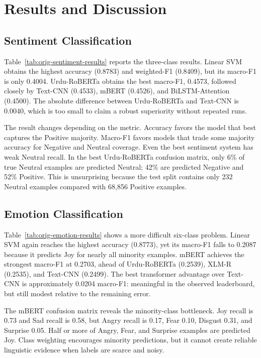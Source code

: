 \documentclass[conference]{IEEEtran}
\begin{document}
\section{Results and Discussion}



\subsection{Sentiment Classification}
Table~\ref{tab:orig-sentiment-results} reports the three-class results. Linear SVM obtains the highest accuracy (0.8783) and weighted-F1 (0.8409), but its macro-F1 is only 0.4004. Urdu-RoBERTa obtains the best macro-F1, 0.4573, followed closely by Text-CNN (0.4533), mBERT (0.4526), and BiLSTM-Attention (0.4500). The absolute difference between Urdu-RoBERTa and Text-CNN is 0.0040, which is too small to claim a robust superiority without repeated runs.

The result changes depending on the metric. Accuracy favors the model that best captures the Positive majority. Macro-F1 favors models that trade some majority accuracy for Negative and Neutral coverage. Even the best sentiment system has weak Neutral recall. In the best Urdu-RoBERTa confusion matrix, only 6\% of true Neutral examples are predicted Neutral; 42\% are predicted Negative and 52\% Positive. This is unsurprising because the test split contains only 232 Neutral examples compared with 68,856 Positive examples.

\subsection{Emotion Classification}
Table~\ref{tab:orig-emotion-results} shows a more difficult six-class problem. Linear SVM again reaches the highest accuracy (0.8773), yet its macro-F1 falls to 0.2087 because it predicts Joy for nearly all minority examples. mBERT achieves the strongest macro-F1 at 0.2703, ahead of Urdu-RoBERTa (0.2539), XLM-R (0.2535), and Text-CNN (0.2499). The best transformer advantage over Text-CNN is approximately 0.0204 macro-F1: meaningful in the observed leaderboard, but still modest relative to the remaining error.

The mBERT confusion matrix reveals the minority-class bottleneck. Joy recall is 0.73 and Sad recall is 0.58, but Angry recall is 0.17, Fear 0.10, Disgust 0.31, and Surprise 0.05. Half or more of Angry, Fear, and Surprise examples are predicted Joy. Class weighting encourages minority predictions, but it cannot create reliable linguistic evidence when labels are scarce and noisy.
\end{document}
